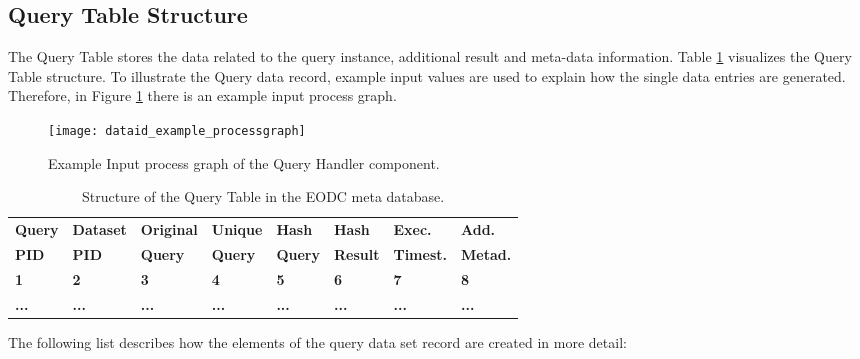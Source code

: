 \documentclass[draft,final]{vutinfth} %
\begin{document}
\subsection{Query Table Structure}

The Query Table stores the data related to the query instance, additional result and meta-data information. Table \ref{Tab:querytable} visualizes the Query Table structure. To illustrate the Query data record, example input values are used to explain how the single data entries are generated. Therefore, in Figure \ref{fig:processgraph_example} there is an example input process graph.   

\begin{figure}[h]
	\centering
	\texttt{[image: dataid\_example\_processgraph]}
	\caption{Example Input process graph of the Query Handler component.}
	\label{fig:processgraph_example} %
\end{figure} %

\begin{table}[]
	\caption{Structure of the Query Table in the EODC meta database.}
	\begin{tabular}{|l|l|l|l|l|l|l|l|}
	\hline	\textbf{Query} & \textbf{Dataset} & \textbf{Original} & \textbf{Unique} & \textbf{Hash} & \textbf{Hash} &
		\textbf{Exec.} & \textbf{Add.}  \\ 
		\textbf{PID} & \textbf{PID} & \textbf{Query} & \textbf{Query} & \textbf{Query} & \textbf{Result} &
		\textbf{Timest.} & \textbf{Metad.}  \\ \hline
		\textbf{1} & \textbf{2} & \textbf{3} & \textbf{4} & \textbf{5} & \textbf{6} &
		\textbf{7} & \textbf{8} \\ \hline
		\textbf{...} & \textbf{...} & \textbf{...} & \textbf{...} & \textbf{...} & \textbf{...} & \textbf{...} & \textbf{...} \\ \hline
	\end{tabular}
	\label{Tab:querytable}
\end{table}

The following list describes how the elements of the query data set record are created in more detail:
\end{document}
